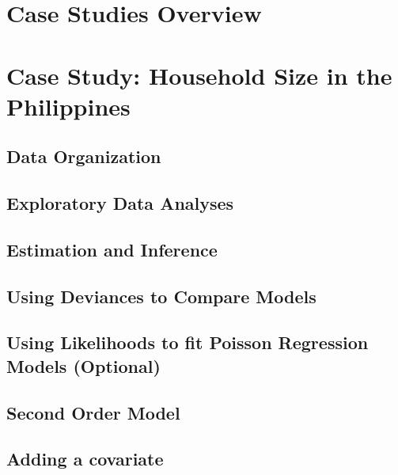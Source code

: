 \documentclass[
]{krantz}
\begin{document}
\hypertarget{case-studies-overview}{%
\section{Case Studies Overview}\label{case-studies-overview}}

\hypertarget{case-study-household-size-in-the-philippines}{%
\section{Case Study: Household Size in the Philippines}\label{case-study-household-size-in-the-philippines}}

\hypertarget{organizedata1}{%
\subsection{Data Organization}\label{organizedata1}}

\hypertarget{explore}{%
\subsection{Exploratory Data Analyses}\label{explore}}

\hypertarget{sec-PoisInference}{%
\subsection{Estimation and Inference}\label{sec-PoisInference}}

\hypertarget{sec-Devtocompare}{%
\subsection{Using Deviances to Compare Models}\label{sec-Devtocompare}}

\hypertarget{likelihood.sec}{%
\subsection{Using Likelihoods to fit Poisson Regression Models (Optional)}\label{likelihood.sec}}

\hypertarget{second-order-model}{%
\subsection{Second Order Model}\label{second-order-model}}

\hypertarget{adding-a-covariate}{%
\subsection{Adding a covariate}\label{adding-a-covariate}}
\end{document}
